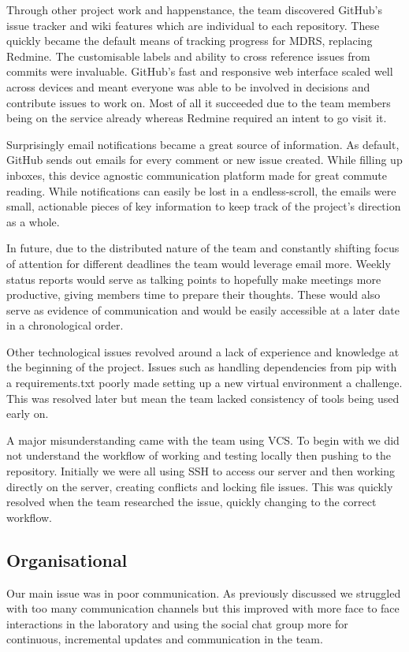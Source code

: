 \documentclass{l3proj}
\begin{document}
Through other project work and happenstance, the team discovered GitHub's issue
tracker and wiki features which are individual to each repository. These quickly
became the default means of tracking progress for MDRS, replacing Redmine. The
customisable labels and ability to cross reference issues from commits were
invaluable. GitHub's fast and responsive web interface scaled well across
devices and meant everyone was able to be involved in decisions and contribute
issues to work on. Most of all it succeeded due to the team members being on the
service already whereas Redmine required an intent to go visit it.

Surprisingly email notifications became a great source of information. As
default, GitHub sends out emails for every comment or new issue created. While
filling up inboxes, this device agnostic communication platform made for great
commute reading. While notifications can easily be lost in a endless-scroll, the
emails were small, actionable pieces of key information to keep track of the
project's direction as a whole.

In future, due to the distributed nature of the team and constantly shifting
focus of attention for different deadlines the team would leverage email more.
Weekly status reports would serve as talking points to hopefully make meetings
more productive, giving members time to prepare their thoughts. These would also
serve as evidence of communication and would be easily accessible at a later
date in a chronological order.

Other technological issues revolved around a lack of experience and knowledge at
the beginning of the project. Issues such as handling dependencies from pip with
a requirements.txt poorly made setting up a new virtual environment a challenge.
This was resolved later but mean the team lacked consistency of tools being used
early on.

A major misunderstanding came with the team using VCS. To begin with we did not
understand the workflow of working and testing locally then pushing to the
repository. Initially we were all using SSH to access our server and then
working directly on the server, creating conflicts and locking file issues. This
was quickly resolved when the team researched the issue, quickly changing to the
correct workflow.

\subsection{Organisational}
Our main issue was in poor communication. As
previously discussed we struggled with too many communication channels but this
improved with more face to face interactions in the laboratory and using the
social chat group more for continuous, incremental updates and communication in
the team.
\end{document}
